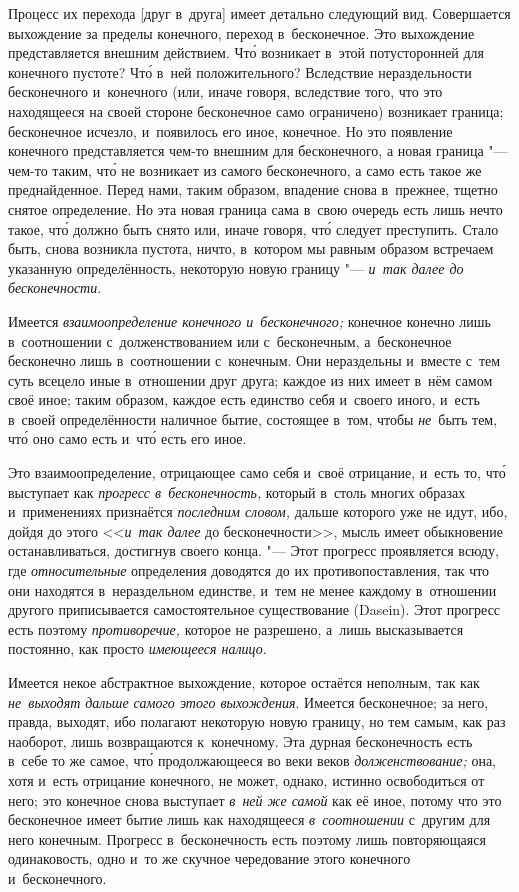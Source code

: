 Процесс их перехода [друг в~друга] имеет детально следующий вид. Совершается
выхождение за пределы конечного, переход в~бесконечное. Это выхождение
представляется внешним действием. Чт\'{о} возникает в~этой потусторонней для
конечного пустоте? Чт\'{о} в~ней положительного? Вследствие нераздельности
бесконечного и~конечного (или, иначе говоря, вследствие того, что это
находящееся на своей стороне бесконечное само ограничено) возникает
граница; бесконечное исчезло, и~появилось его иное, конечное. Но это
появление конечного представляется чем-то внешним для бесконечного, а
новая граница "--- чем-то таким, чт\'{о} не возникает из самого бесконечного, а
само есть такое же преднайденное. Перед нами, таким образом, впадение снова
в~прежнее, тщетно снятое определение. Но эта новая граница сама в~свою
очередь есть лишь нечто такое, чт\'{о} должно быть снято или, иначе говоря, чт\'{о}
следует преступить. Стало быть, снова возникла пустота, ничто, в~котором мы
равным образом встречаем указанную определённость, некоторую новую границу
"--- {\em и~так далее до бесконечности}.

Имеется {\em взаимоопределение конечного и~бесконечного;} конечное конечно лишь
в~соотношении с~долженствованием или с~бесконечным, а~бесконечное бесконечно
лишь в~соотношении с~конечным. Они нераздельны и~вместе с~тем суть всецело иные
в~отношении друг друга; каждое из них имеет в~нём самом своё иное; таким
образом, каждое есть единство себя и~своего иного, и~есть в~своей
определённости наличное бытие, состоящее в~том, чтобы {\em не}~быть тем, чт\'{о}
оно само есть и~чт\'{о} есть его иное.

Это взаимоопределение, отрицающее само себя и~своё отрицание, и~есть то, чт\'{о}
выступает как {\em прогресс в~бесконечность,} который в~столь многих образах
и~применениях признаётся {\em последним словом,} дальше которого уже не идут,
ибо, дойдя до этого <<{\em и~так далее} до бесконечности>>, мысль имеет
обыкновение останавливаться, достигнув своего конца. "--- Этот прогресс
проявляется всюду, где {\em относительные} определения доводятся до их
противопоставления, так что они находятся в~нераздельном единстве, и~тем не
менее каждому в~отношении другого приписывается самостоятельное существование
(Dasein). Этот прогресс есть поэтому {\em противоречие,} которое не разрешено,
а~лишь высказывается постоянно, как просто {\em имеющееся налицо}.

Имеется некое абстрактное выхождение, которое остаётся неполным, так как
{\em не~выходят дальше самого этого выхождения}. Имеется бесконечное; за него,
правда, выходят, ибо полагают некоторую новую границу, но тем самым, как раз
наоборот, лишь возвращаются к~конечному. Эта дурная бесконечность есть в~себе
то же самое, чт\'{о} продолжающееся во веки веков {\em долженствование;} она, хотя
и~есть отрицание конечного, не может, однако, истинно освободиться от него; это
конечное снова выступает {\em в~ней же самой} как её иное, потому что это
бесконечное имеет бытие лишь как находящееся {\em в~соотношении} с~другим для
него конечным. Прогресс в~бесконечность есть поэтому лишь повторяющаяся
одинаковость, одно и~то же скучное чередование этого конечного и~бесконечного.


